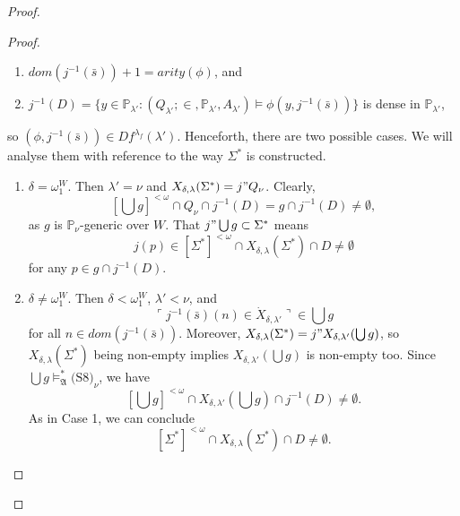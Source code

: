 \documentclass[12pt, twoside]{memoir}
\numberwithin{equation}{section}
\theoremstyle{definition}
\theoremstyle{remark}
\theoremstyle{definition}
\theoremstyle{definition}
\theoremstyle{definition}
\theoremstyle{remark}
\newcommand{\eq}{=}
\begin{document}
\begin{proof}
\begin{proof}
\begin{enumerate}[label=<$k$> $\eq$ \arabic* :, leftmargin=70pt]
\begin{enumerate}[label=(\alph*)]
        \item $dom(j^{-1}(\bar{s})) + 1 = arity(\phi)$, and
        \item $j^{-1}(D) = \{y \in \mathbb{P}_{\lambda'} : (Q_{\lambda'}; \in, \mathbb{P}_{\lambda'}, A_{\lambda'}) \models \phi(y, j^{-1}(\bar{s}))\}$ is dense in $\mathbb{P}_{\lambda'}$,
    \end{enumerate}
    so $(\phi, j^{-1}(\bar{s})) \in Df^{\lambda_f}(\lambda')$. Henceforth, there are two possible cases. We will analyse them with reference to the way $\Sigma^*$ is constructed. 
    \begin{enumerate}[label=Case \arabic*:, leftmargin=50pt]
        \item\label{c8c1} $\delta = \omega_1^W$. Then $\lambda' = \nu$ and $X_{\delta, \lambda}(\Sigma^*) = j" Q_{\nu}$. Clearly, $$[\bigcup g]^{< \omega} \cap Q_{\nu} \cap j^{-1}(D) = g \cap j^{-1}(D) \neq \emptyset,$$ as $g$ is $\mathbb{P}_{\nu}$-generic over $W$. That $j" \bigcup g \subset \Sigma^*$ means $$j(p) \in [\Sigma^*]^{< \omega} \cap X_{\delta, \lambda}(\Sigma^*) \cap D \neq \emptyset$$ for any $p \in g \cap j^{-1}(D)$.
        \item $\delta \neq \omega_1^W$. Then $\delta < \omega_1^W$, $\lambda' < \nu$, and $$\ulcorner j^{-1}(\bar{s})(n) \in \dot{X}_{\delta, \lambda'} \urcorner \in \bigcup g$$ for all $n \in dom(j^{-1}(\bar{s}))$. Moreover, $X_{\delta, \lambda}(\Sigma^*) = j" X_{\delta, \lambda'}(\bigcup g)$, so $X_{\delta, \lambda}(\Sigma^*)$ being non-empty implies $X_{\delta, \lambda'}(\bigcup g)$ is non-empty too. Since $\bigcup g \models^*_{\mathfrak{A}} \text{(S8)}_{\nu}$, we have $$[\bigcup g]^{< \omega} \cap X_{\delta, \lambda'}(\bigcup g) \cap j^{-1}(D) \neq \emptyset.$$ As in Case 1, we can conclude $$[\Sigma^*]^{< \omega} \cap X_{\delta, \lambda}(\Sigma^*) \cap D \neq \emptyset.$$
    \end{enumerate}
\end{enumerate}


\end{proof}
\end{proof}
\end{document}
